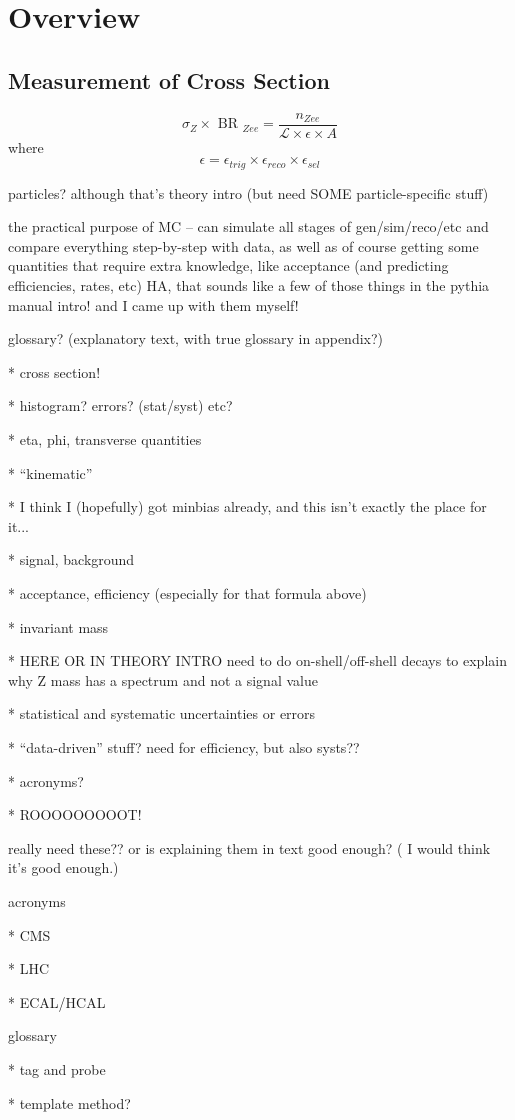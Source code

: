 \chapter{Overview}
\label{over}
\section{Measurement of Cross Section}
\label{over:xsec}
\[
\sigma_{ Z } \times \textrm{ BR }_{ Zee } = \frac{ n_{ Zee } }{  \mathcal{ L } \times \epsilon \times A}
\]
where
\[
\epsilon = \epsilon_{ trig } \times \epsilon_{ reco } \times \epsilon_{ sel }
\]

particles?  although that's theory intro (but need SOME particle-specific stuff) 

the practical purpose of MC -- can simulate all stages of gen/sim/reco/etc and compare 
everything step-by-step with data, as well as of course getting some quantities 
that require extra knowledge, like acceptance (and predicting efficiencies, rates, etc)
HA, that sounds like a few of those things in the pythia manual intro!  and I came 
up with them myself!  

glossary? (explanatory text, with true glossary in appendix?)  

   * cross section!

   * histogram?  errors? (stat/syst) etc?

   * eta, phi, transverse quantities

   * ``kinematic''

   * I think I (hopefully) got minbias already, and this isn't exactly the place for it... 

   * signal, background

   * acceptance, efficiency (especially for that formula above)

   * invariant mass

   * HERE OR IN THEORY INTRO need to do on-shell/off-shell decays 
to explain why Z mass has a spectrum and not a signal value

   * statistical and systematic uncertainties or errors

   * ``data-driven'' stuff?  need for efficiency, but also systs??

   * acronyms?  

   * ROOOOOOOOOT!




really need these??  or is explaining them in text good enough?  (
I would think it's good enough.)

acronyms

   * CMS

   * LHC

   * ECAL/HCAL



glossary

   * tag and probe

   * template method?